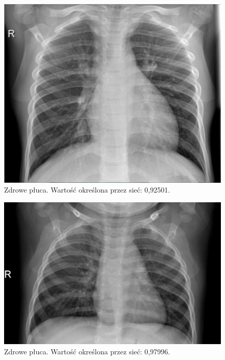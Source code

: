 \documentclass[12pt,a4paper,twoside,titlepage,openright]{book}
\begin{document}
\begin{figure}[ht]
	\centering
			\includegraphics[resolution=100, scale=0.3]{randomIncorrect1.png}
		\caption{Zdrowe płuca. Wartość określona przez sieć: 0,92501.}
				\label{fig:randomIncorrect1}
\end{figure}

\begin{figure}[ht]
	\centering
			\includegraphics[resolution=100, scale=0.3]{randomIncorrect2.png}
		\caption{Zdrowe płuca. Wartość określona przez sieć: 0,97996.}
				\label{fig:randomIncorrect2}
\end{figure}
\end{document}
